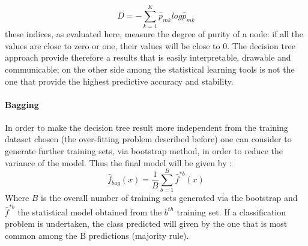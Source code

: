 \documentclass[
12pt, %
a4paper, %
oneside, %
headinclude,footinclude, %
BCOR5mm, %
]{scrartcl}
\begin{document}
\begin{equation}
D=-\sum_{k=1}^{K}\hat{p}_{mk}log\hat{p}_{mk}
\end{equation}
these indices, as evaluated here, measure the degree of purity of a node: if all the values are close to zero or one, their values will be close to 0. The decision tree approach provide therefore a results that is easily interpretable, drawable and communicable; on the other side among the statistical learning tools is not the one that provide the highest predictive accuracy and stability. 


\paragraph{Bagging}

In order to make the decision tree result more independent from the training dataset chosen (the over-fitting problem described before) one can consider to generate further training sets, via bootstrap method, in order to reduce the variance of the model. Thus the final model will be given by \cite{james2013introduction}: 
\begin{equation}
\hat{f}_{bag}\left(x\right)=\dfrac{1}{B}\sum_{b=1}^{B}\hat{f}^{*b}\left(x\right)
\end{equation}
Where $B$ is the overall number of training sets generated via the bootstrap and $\hat{f}^{*b}$ the statistical model obtained from the $b^{th}$ training set. If a classification problem is undertaken, the class predicted will given by the one that is most common among the B predictions (majority rule).
\end{document}
